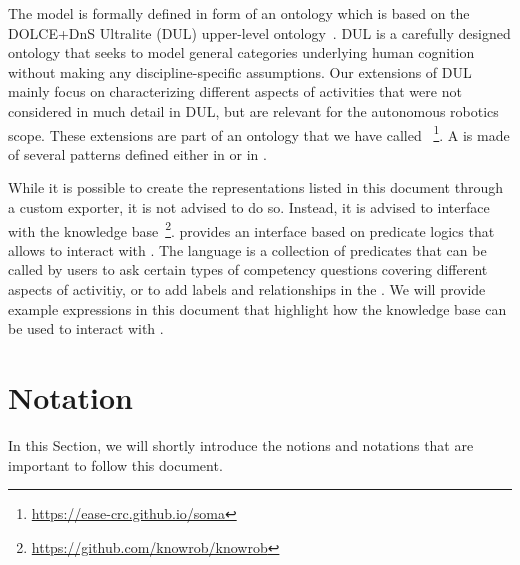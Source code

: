 The \neem model is formally defined in form of an \owl ontology which is based on the DOLCE+DnS Ultralite (DUL) upper-level ontology~\cite{DOLCE2003}.
DUL is a carefully designed ontology that seeks to model general categories underlying human cognition without making any discipline-specific assumptions.
Our extensions of DUL mainly focus on characterizing different aspects of activities that were not considered in much detail in DUL, but are relevant for the autonomous robotics scope.
These extensions are part of an ontology that we have called
\soma~\footnote{\url{https://ease-crc.github.io/soma}}.
A \neem is made of several patterns defined either in \dul or in \soma.

While it is possible to create the representations listed in this document through a custom exporter, it is not advised to do so.
Instead, it is advised to interface with the
\knowrob knowledge base~\footnote{\url{https://github.com/knowrob/knowrob}}.
\knowrob provides an interface based on predicate logics that allows to interact with \neems.
The language is a collection of predicates that can be called by users to ask certain types of competency questions covering different aspects of activitiy, or to add labels and relationships in the \neemnar.
We will provide example expressions in this document that highlight how the knowledge base can be used to interact with \neems.

\lipsum[4]

\section{Notation} %
\label{sec:notation}

In this Section, we will shortly introduce the notions and notations that are important to follow this document.

